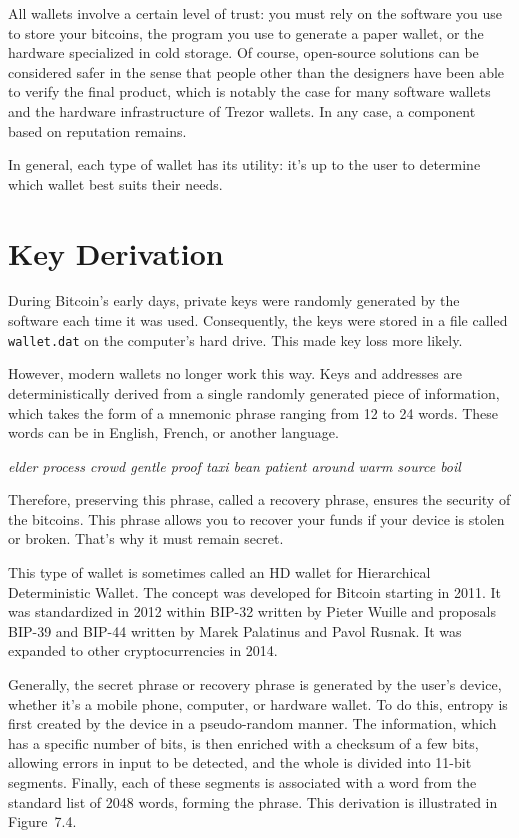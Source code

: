 \documentclass[
  a5paper,
  smalldemyvopaper,10pt,twoside,onecolumn,openright,extrafontsizes,hidelinks]{memoir}
\begin{document}
All wallets involve a certain level of trust: you must rely on the
software you use to store your bitcoins, the program you use to generate
a paper wallet, or the hardware specialized in cold storage. Of course,
open-source solutions can be considered safer in the sense that people
other than the designers have been able to verify the final product,
which is notably the case for many software wallets and the hardware
infrastructure of Trezor wallets. In any case, a component based on
reputation remains.

In general, each type of wallet has its utility: it's up to the user to
determine which wallet best suits their needs.

\section*{Key Derivation}\label{key-derivation}


During Bitcoin's early days, private keys were randomly generated by the
software each time it was used. Consequently, the keys were stored in a
file called \texttt{wallet.dat} on the computer's hard drive. This made
key loss more likely.

However, modern wallets no longer work this way. Keys and addresses are
deterministically derived from a single randomly generated piece of
information, which takes the form of a mnemonic phrase ranging from 12
to 24 words. These words can be in English, French, or another language.

\emph{elder process crowd gentle proof taxi bean patient around warm
source boil}

Therefore, preserving this phrase, called a recovery phrase, ensures the
security of the bitcoins. This phrase allows you to recover your funds
if your device is stolen or broken. That's why it must remain secret.

This type of wallet is sometimes called an HD wallet for Hierarchical
Deterministic Wallet. The concept was developed for Bitcoin starting in
2011. It was standardized in 2012 within BIP-32 written by Pieter Wuille
and proposals BIP-39 and BIP-44 written by Marek Palatinus and Pavol
Rusnak. It was expanded to other cryptocurrencies in 2014.

Generally, the secret phrase or recovery phrase is generated by the
user's device, whether it's a mobile phone, computer, or hardware
wallet. To do this, entropy is first created by the device in a
pseudo-random manner. The information, which has a specific number of
bits, is then enriched with a checksum of a few bits, allowing errors in
input to be detected, and the whole is divided into 11-bit segments.
Finally, each of these segments is associated with a word from the
standard list of 2048 words, forming the phrase. This derivation is
illustrated in Figure~7.4.
\end{document}
